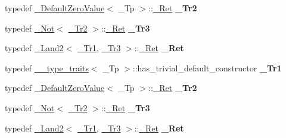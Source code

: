 \begin{DoxyCompactItemize}
typedef \hyperlink{struct___default_zero_value}{\+\_\+\+Default\+Zero\+Value}$<$ \+\_\+\+Tp $>$\+::\hyperlink{struct____false__type}{\+\_\+\+Ret} {\bfseries \+\_\+\+Tr2}
\item 
\mbox{\label{struct___trivial_init_ab282d3ab96a2ff44f3e10591f94641a0}} 
typedef \hyperlink{struct___not}{\+\_\+\+Not}$<$ \hyperlink{struct____true__type}{\+\_\+\+Tr2} $>$\+::\hyperlink{struct____false__type}{\+\_\+\+Ret} {\bfseries \+\_\+\+Tr3}
\item 
\mbox{\label{struct___trivial_init_acdf26a889e795b39be41f1d0cc107ba5}} 
typedef \hyperlink{struct___land2}{\+\_\+\+Land2}$<$ \hyperlink{struct____true__type}{\+\_\+\+Tr1}, \hyperlink{struct____false__type}{\+\_\+\+Tr3} $>$\+::\hyperlink{struct____false__type}{\+\_\+\+Ret} {\bfseries \+\_\+\+Ret}
\item 
\mbox{\label{struct___trivial_init_a43aceb85a9186853b5290b0a7f02a2f5}} 
typedef \hyperlink{struct____type__traits}{\+\_\+\+\_\+type\+\_\+traits}$<$ \+\_\+\+Tp $>$\+::has\+\_\+trivial\+\_\+default\+\_\+constructor {\bfseries \+\_\+\+Tr1}
\item 
\mbox{\label{struct___trivial_init_a2b870065bbb9c93f013c520ccdb99ecf}} 
typedef \hyperlink{struct___default_zero_value}{\+\_\+\+Default\+Zero\+Value}$<$ \+\_\+\+Tp $>$\+::\hyperlink{struct____false__type}{\+\_\+\+Ret} {\bfseries \+\_\+\+Tr2}
\item 
\mbox{\label{struct___trivial_init_ab282d3ab96a2ff44f3e10591f94641a0}} 
typedef \hyperlink{struct___not}{\+\_\+\+Not}$<$ \hyperlink{struct____true__type}{\+\_\+\+Tr2} $>$\+::\hyperlink{struct____false__type}{\+\_\+\+Ret} {\bfseries \+\_\+\+Tr3}
\item 
\mbox{\label{struct___trivial_init_acdf26a889e795b39be41f1d0cc107ba5}} 
typedef \hyperlink{struct___land2}{\+\_\+\+Land2}$<$ \hyperlink{struct____true__type}{\+\_\+\+Tr1}, \hyperlink{struct____false__type}{\+\_\+\+Tr3} $>$\+::\hyperlink{struct____false__type}{\+\_\+\+Ret} {\bfseries \+\_\+\+Ret}
\end{DoxyCompactItemize}
